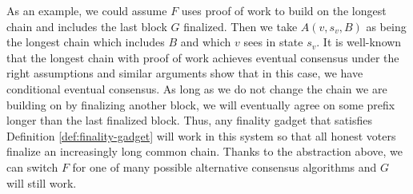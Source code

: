 \documentclass[a4paper,UKenglish,cleveref, autoref, thm-restate, anonymous]{lipics-v2019}
\begin{document}
As an example, we could assume $F$ uses proof of work to build on the longest chain and includes the last block $G$ finalized. Then we take $A(v,s_v,B)$ as being the longest chain which includes $B$ and which $v$ sees in state $s_v$. It is well-known \cite{nakamoto08bitcoin} that the longest chain with proof of work achieves eventual consensus under the right assumptions and similar arguments show that in this case, we have conditional eventual consensus.
As long as we do not change the chain we are building on by finalizing another block, we will eventually agree on some prefix longer than the last finalized block.
Thus, any finality gadget that satisfies Definition \ref{def:finality-gadget} will work in this system so that all honest voters finalize an increasingly long common chain.
Thanks to the abstraction above, we can switch $F$ for one of many possible alternative consensus algorithms and $G$ will still work.
\end{document}
